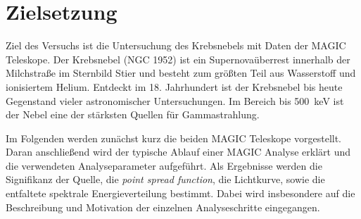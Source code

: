 \section{Zielsetzung}
\label{sec:zielsetzung}

Ziel des Versuchs ist die Untersuchung des Krebsnebels mit Daten der MAGIC
Teleskope. Der Krebsnebel (NGC 1952) ist ein Supernovaüberrest innerhalb der
Milchstraße im Sternbild Stier und besteht zum größten Teil aus Wasserstoff und
ionisiertem Helium. Entdeckt im 18. Jahrhundert ist der Krebsnebel bis heute
Gegenstand vieler astronomischer Untersuchungen. Im Bereich bis
\SI{500}{\kilo\electronvolt} ist der Nebel eine der stärksten Quellen für
Gammastrahlung.

Im Folgenden werden zunächst kurz die beiden MAGIC Teleskope vorgestellt. Daran
anschließend wird der typische Ablauf einer MAGIC Analyse erklärt und die
verwendeten Analyseparameter aufgeführt. Als Ergebnisse werden die Signifikanz
der Quelle, die \textit{point spread function}, die Lichtkurve, sowie die
entfaltete spektrale Energieverteilung bestimmt. Dabei wird insbesondere auf die
Beschreibung und Motivation der einzelnen Analyseschritte eingegangen.
